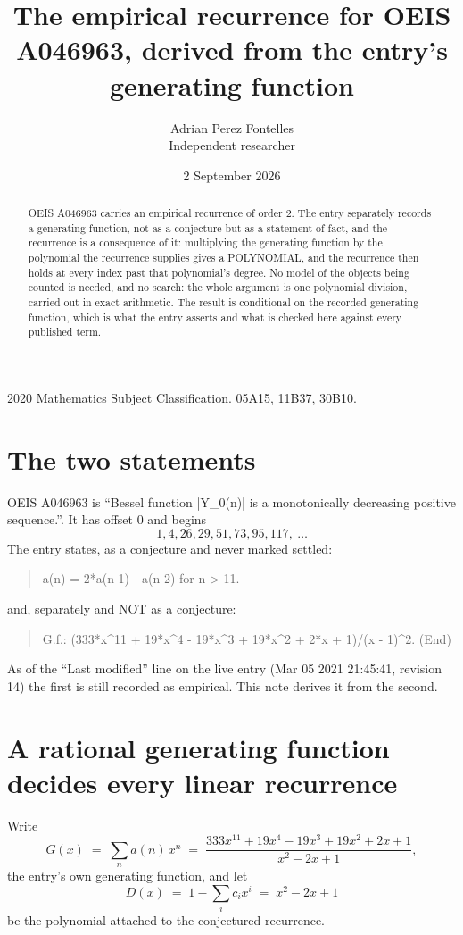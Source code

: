 \documentclass[11pt,a4paper]{article}
\title{The empirical recurrence for OEIS A046963, derived from the entry's generating function}
\author{Adrian Perez Fontelles\\ \small Independent researcher}
\date{2 September 2026}
\theoremstyle{plain}
\theoremstyle{definition}
\begin{document}
\maketitle

\begin{abstract}
OEIS A046963 carries an empirical recurrence of order $2$. The entry separately records a
generating function, not as a conjecture but as a statement of fact, and the recurrence is a
consequence of it: multiplying the generating function by the polynomial the recurrence
supplies gives a POLYNOMIAL, and the recurrence then holds at every index past that
polynomial's degree. No model of the objects being counted is needed, and no search: the
whole argument is one polynomial division, carried out in exact arithmetic. The result is
conditional on the recorded generating function, which is what the entry asserts and what is
checked here against every published term.
\end{abstract}

\noindent\small 2020 Mathematics Subject Classification. 05A15, 11B37, 30B10.\normalsize

\section{The two statements}

OEIS A046963 is ``Bessel function |Y\_0(n)| is a monotonically decreasing positive sequence.''. It has offset $0$ and begins
\[
1, 4, 26, 29, 51, 73, 95, 117,\ \dots
\]
The entry states, as a conjecture and never marked settled:
\begin{quote}
a(n) = 2*a(n-1) - a(n-2) for n > 11.
\end{quote}
and, separately and NOT as a conjecture:
\begin{quote}
G.f.: (333*x\^{}11 + 19*x\^{}4 - 19*x\^{}3 + 19*x\^{}2 + 2*x + 1)/(x - 1)\^{}2. (End)
\end{quote}
As of the ``Last modified'' line on the live entry (Mar 05 2021 21:45:41, revision 14) the first is still
recorded as empirical. This note derives it from the second.

\section{A rational generating function decides every linear recurrence}

Write
\[
G(x)\;=\;\sum_{n}a(n)\,x^{n}\;=\;\frac{333 x^{11} + 19 x^{4} - 19 x^{3} + 19 x^{2} + 2 x + 1}{x^{2} - 2 x + 1},
\]
the entry's own generating function, and let
\[
D(x)\;=\;1-\sum_i c_i x^{i}\;=\;x^{2} - 2 x + 1
\]
be the polynomial attached to the conjectured recurrence.
\end{document}
